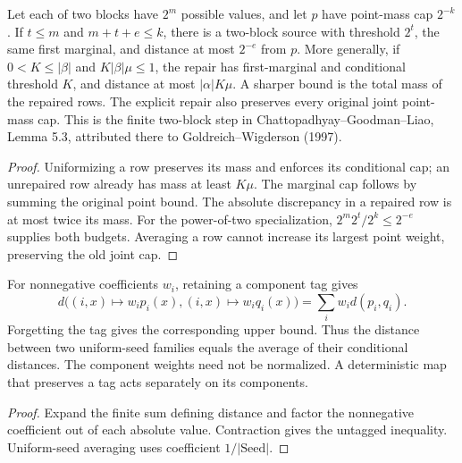 \begin{theorem}
  \label{thm:lowerbounds-algebraic-two-block-repair}
  \leanok
  Let each of two blocks have $2^m$ possible values, and let $p$ have
  point-mass cap $2^{-k}$. If $t\le m$ and $m+t+e\le k$, there is a
  two-block source with threshold $2^t$, the same first marginal, and
  distance at most $2^{-e}$ from $p$. More generally, if $0<K\le|\beta|$
  and $K|\beta|\mu\le1$, the repair has first-marginal and conditional
  threshold $K$, and distance at most $|\alpha|K\mu$. A sharper bound is
  the total mass of the repaired rows. The explicit repair also preserves
  every original joint point-mass cap. This is the finite two-block step
  in Chattopadhyay--Goodman--Liao, Lemma 5.3, attributed there to
  Goldreich--Wigderson (1997).
\end{theorem}
\begin{proof}
  \leanok
  Uniformizing a row preserves its mass and enforces its conditional cap;
  an unrepaired row already has mass at least $K\mu$. The marginal cap
  follows by summing the original point bound. The absolute discrepancy
  in a repaired row is at most twice its mass. For the power-of-two
  specialization, $2^m2^t/2^k\le2^{-e}$ supplies both budgets. Averaging a
  row cannot increase its largest point weight, preserving the old joint cap.
\end{proof}

\begin{theorem}
  \label{thm:lowerbounds-algebraic-tagged-distance}
  \leanok
  For nonnegative coefficients $w_i$, retaining a component tag gives
  \[
    d\bigl((i,x)\mapsto w_ip_i(x),(i,x)\mapsto w_iq_i(x)\bigr)
      =\sum_iw_i d(p_i,q_i).
  \]
  Forgetting the tag gives the corresponding upper bound. Thus the
  distance between two uniform-seed families equals the average of their
  conditional distances. The component weights need not be normalized.
  A deterministic map that preserves a tag acts separately on its components.
\end{theorem}
\begin{proof}
  \leanok
  Expand the finite sum defining distance and factor the nonnegative
  coefficient out of each absolute value. Contraction gives the untagged
  inequality. Uniform-seed averaging uses coefficient $1/|\mathrm{Seed}|$.
\end{proof}

